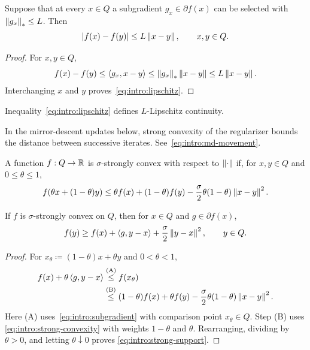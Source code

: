 \begin{Thm:Lemma}
\label{lem:intro:lipschitz}
Suppose that at every $x\in Q$ a subgradient $g_x\in\partial f(x)$ can be
selected with $\left\lVert g_x \right\rVert_*\le L$. Then
\begin{equation}\label{eq:intro:lipschitz}
 |f(x)-f(y)|\le L\left\lVert x-y \right\rVert,\qquad x,y\in Q.
\end{equation}
\end{Thm:Lemma}
\begin{proof}
For $x,y\in Q$,
\[
 f(x)-f(y)
 \le\left\langle g_x,x-y \right\rangle
 \le\left\lVert g_x \right\rVert_*\left\lVert x-y \right\rVert
 \le L\left\lVert x-y \right\rVert.
\]
Interchanging $x$ and $y$ proves~\eqref{eq:intro:lipschitz}.
\end{proof}

Inequality~\eqref{eq:intro:lipschitz} defines $L$-Lipschitz continuity.

In the mirror-descent updates below, strong convexity of the regularizer
bounds the distance between successive iterates.
See~\eqref{eq:intro:md-movement}.

\begin{Thm:Definition}\label{def:strong-convex}
A function $f:Q\to\mathbb{R}$ is $\sigma$-strongly convex with respect to
$\left\lVert \cdot \right\rVert$ if, for $x,y\in Q$ and $0\le\theta\le1$,
\begin{equation}\label{eq:intro:strong-convexity}
 f(\theta x+(1-\theta)y)
 \le\theta f(x)+(1-\theta)f(y)
 -\frac\sigma2\theta(1-\theta)\left\lVert x-y \right\rVert^2.
\end{equation}
\end{Thm:Definition}

If $f$ is $\sigma$-strongly convex on $Q$, then for $x\in Q$ and
$g\in\partial f(x)$,
\begin{equation}\label{eq:intro:strong-support}
 f(y)\ge f(x)+\left\langle g,y-x \right\rangle
 +\frac\sigma2\left\lVert y-x \right\rVert^2,
 \qquad y\in Q.
\end{equation}
\begin{proof}
For $x_\theta\coloneqq(1-\theta)x+\theta y$ and $0<\theta<1$,
\begin{align*}
 f(x)+\theta\left\langle g,y-x \right\rangle
 &\overset{\mathrm{(A)}}{\le} f(x_\theta)\\
 &\overset{\mathrm{(B)}}{\le}(1-\theta)f(x)+\theta f(y)
   -\frac\sigma2\theta(1-\theta)\left\lVert x-y \right\rVert^2.
\end{align*}
Here (A) uses~\eqref{eq:intro:subgradient} with comparison point
$x_\theta\in Q$. Step (B) uses
\eqref{eq:intro:strong-convexity} with weights $1-\theta$ and $\theta$.
Rearranging, dividing by $\theta>0$, and letting
$\theta\downarrow0$ proves
\eqref{eq:intro:strong-support}.
\end{proof}

